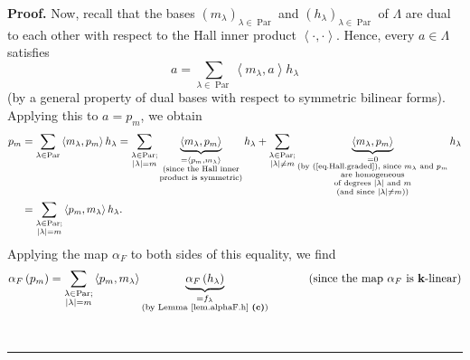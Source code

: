 \documentclass[numbers=enddot,12pt,final,onecolumn,notitlepage]{scrartcl}%
\theoremstyle{definition}
\newenvironment{proof}[1][Proof]{\noindent\textbf{#1.} }{\ \rule{0.5em}{0.5em}}
\let\sumnonlimits\sum
\renewcommand{\sum}{\sumnonlimits\limits}
\newenvironment{vershort}{}{}
\begin{document}
\begin{vershort}
\begin{proof}
Now, recall that the bases $\left(  m_{\lambda}\right)  _{\lambda
\in\operatorname*{Par}}$ and $\left(  h_{\lambda}\right)  _{\lambda
\in\operatorname*{Par}}$ of $\Lambda$ are dual to each other with respect to
the Hall inner product $\left\langle \cdot,\cdot\right\rangle $. Hence, every
$a\in\Lambda$ satisfies%
\[
a=\sum_{\lambda\in\operatorname*{Par}}\left\langle m_{\lambda},a\right\rangle
h_{\lambda}%
\]
(by a general property of dual bases with respect to symmetric bilinear
forms). Applying this to $a=p_{m}$, we obtain%
\begin{align*}
p_{m}  &  =\sum_{\lambda\in\operatorname*{Par}}\left\langle m_{\lambda}%
,p_{m}\right\rangle h_{\lambda}=\sum_{\substack{\lambda\in\operatorname*{Par}%
;\\\left\vert \lambda\right\vert =m}}\underbrace{\left\langle m_{\lambda
},p_{m}\right\rangle }_{\substack{=\left\langle p_{m},m_{\lambda}\right\rangle
\\\text{(since the Hall inner}\\\text{product is symmetric)}}}h_{\lambda}%
+\sum_{\substack{\lambda\in\operatorname*{Par};\\\left\vert \lambda\right\vert
\neq m}}\underbrace{\left\langle m_{\lambda},p_{m}\right\rangle }%
_{\substack{=0\\\text{(by (\ref{eq.Hall.graded}), since }m_{\lambda}\text{ and
}p_{m}\\\text{are homogeneous}\\\text{of degrees }\left\vert \lambda
\right\vert \text{ and }m\\\text{(and since }\left\vert \lambda\right\vert
\neq m\text{))}}}h_{\lambda}\\
&  =\sum_{\substack{\lambda\in\operatorname*{Par};\\\left\vert \lambda
\right\vert =m}}\left\langle p_{m},m_{\lambda}\right\rangle h_{\lambda}.
\end{align*}
Applying the map $\alpha_{F}$ to both sides of this equality, we find%
\begin{align*}
\alpha_{F}\left(  p_{m}\right)   &  =\sum_{\substack{\lambda\in
\operatorname*{Par};\\\left\vert \lambda\right\vert =m}}\left\langle
p_{m},m_{\lambda}\right\rangle \underbrace{\alpha_{F}\left(  h_{\lambda
}\right)  }_{\substack{=f_{\lambda}\\\text{(by Lemma \ref{lem.alphaF.h}
\textbf{(c)})}}}\ \ \ \ \ \ \ \ \ \ \left(  \text{since the map }\alpha
_{F}\text{ is }\mathbf{k}\text{-linear}\right) \\

\end{align*}
\end{proof}
\end{vershort}
\end{document}

